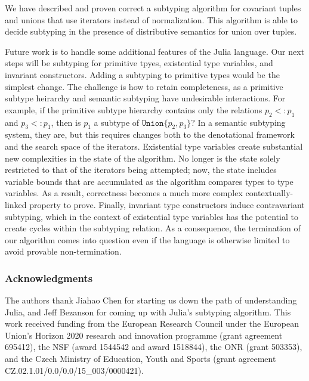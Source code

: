 \documentclass[a4paper,english]{lipics-v2019}
\newcommand{\xt}[1]{\texttt{#1}}
\newcommand{\union}[2]{\xt{Union\{}#1,#2\xt{\}}}
\newcommand{\sub}{<:}
\begin{document}
We have described and proven correct a subtyping algorithm for covariant
tuples and unions that use iterators instead of normalization.  This
algorithm is able to decide subtyping in the presence of distributive
semantics for union over tuples.

Future work is to handle some additional features of the Julia language.
Our next steps will be subtyping for primitive tpyes, existential type
variables, and invariant constructors.  Adding a subtyping to primitive
types would be the simplest change. The challenge is how to retain
completeness, as a primitive subtype heirarchy and semantic subtyping have
undesirable interactions.  For example, if the primitive subtype hierarchy
contains only the relations $p_2 \sub p_1$ and $p_3 \sub p_1$, then is
$p_1$ a subtype of $\union{p_2}{p_3}$? In a semantic subtyping system, they
are, but this requires changes both to the denotational framework and the
search space of the iterators.  Existential type variables create
substantial new complexities in the state of the algorithm. No longer is the
state solely restricted to that of the iterators being attempted; now, the
state includes variable bounds that are accumulated as the algorithm
compares types to type variables. As a result, correctness becomes a much
more complex contextually-linked property to prove.  Finally, invariant type
constructors induce contravariant subtyping, which in the context of
existential type variables has the potential to create cycles within the
subtyping relation. As a consequence, the termination of our algorithm comes
into question even if the language is otherwise limited to avoid provable
non-termination.

\medskip

\subsubsection*{Acknowledgments}
The authors thank Jiahao Chen for starting us down the path of understanding
Julia, and Jeff Bezanson for coming up with Julia's subtyping algorithm.  This
work received funding from the European Research Council under the European
Union's Horizon 2020 research and innovation programme (grant agreement
695412), the NSF (award 1544542 and award 1518844), the ONR (grant 503353), and the Czech Ministry of
Education, Youth and Sports (grant agreement
CZ.02.1.01/0.0/0.0/15\_003/0000421).
 

%

\end{document}
